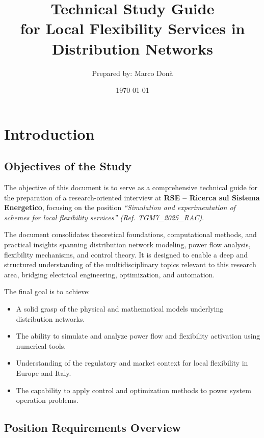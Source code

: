 \documentclass[11pt]{article}
\title{Technical Study Guide\\for Local Flexibility Services in Distribution Networks}
\author{Prepared by: Marco Donà}
\date{\today}
\begin{document}
	
	\maketitle
	\tableofcontents
	\newpage
	
	\section{Introduction}
	
	\subsection*{Objectives of the Study}
	
	The objective of this document is to serve as a comprehensive technical guide for the preparation of a research-oriented interview at \textbf{RSE – Ricerca sul Sistema Energetico}, focusing on the position \textit{“Simulation and experimentation of schemes for local flexibility services” (Ref. TGM7\_2025\_RAC)}.
	
	The document consolidates theoretical foundations, computational methods, and practical insights spanning distribution network modeling, power flow analysis, flexibility mechanisms, and control theory.  
	It is designed to enable a deep and structured understanding of the multidisciplinary topics relevant to this research area, bridging electrical engineering, optimization, and automation.
	
	The final goal is to achieve:
	\begin{itemize}
		\item A solid grasp of the physical and mathematical models underlying distribution networks.
		\item The ability to simulate and analyze power flow and flexibility activation using numerical tools.
		\item Understanding of the regulatory and market context for local flexibility in Europe and Italy.
		\item The capability to apply control and optimization methods to power system operation problems.
	\end{itemize}
	
	\subsection*{Position Requirements Overview}
	
\end{document}
